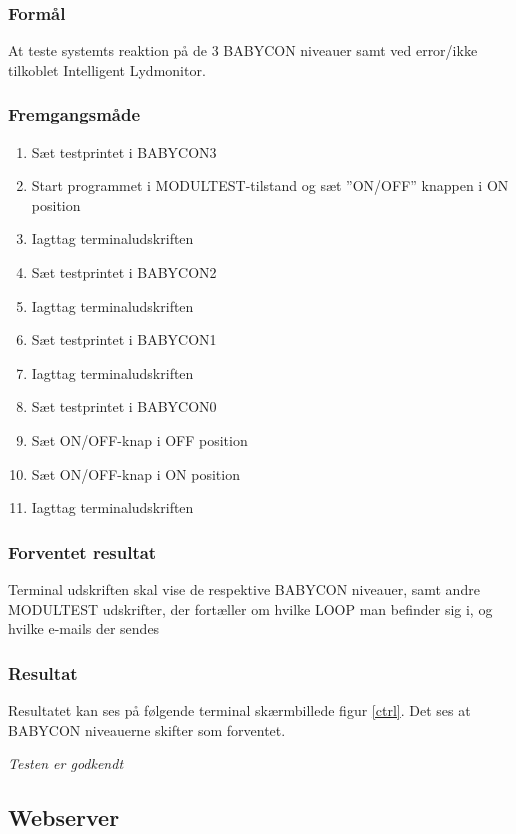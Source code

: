 \subsubsection*{Formål}
At teste systemts reaktion på de 3 BABYCON niveauer samt ved error/ikke tilkoblet Intelligent Lydmonitor.

\subsubsection*{Fremgangsmåde}
\begin{enumerate}
\item Sæt testprintet i BABYCON3
\item Start programmet i MODULTEST-tilstand og sæt ''ON/OFF'' knappen i ON position
\item Iagttag terminaludskriften
\item Sæt testprintet i BABYCON2
\item Iagttag terminaludskriften
\item Sæt testprintet i BABYCON1
\item Iagttag terminaludskriften
\item Sæt testprintet i BABYCON0
\item Sæt ON/OFF-knap i OFF position
\item Sæt ON/OFF-knap i ON position
\item Iagttag terminaludskriften
\end{enumerate}

\subsubsection*{Forventet resultat} 
Terminal udskriften skal vise de respektive BABYCON niveauer, samt andre MODULTEST udskrifter, der fortæller om hvilke LOOP man befinder sig i, og hvilke e-mails der sendes

\subsubsection*{Resultat} 
Resultatet kan ses på følgende terminal skærmbillede figur \ref{ctrl}. Det ses at BABYCON niveauerne skifter som forventet.


\textit{Testen er godkendt}



\subsection*{Webserver}

